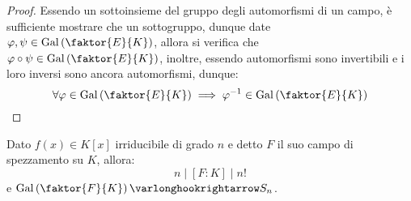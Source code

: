\documentclass[11pt]{scrartcl}
\begin{document}
\begin{proof}
    Essendo un sottoinsieme del gruppo degli automorfismi di un campo, è sufficiente mostrare che un sottogruppo, dunque date $\varphi,\psi \in \Gal\left(\faktor{E}{K}\right)$, allora 
    si verifica che $\varphi \circ \psi \in \Gal\left(\faktor{E}{K}\right)$, inoltre, essendo automorfismi sono invertibili e i loro inversi sono ancora automorfismi, dunque:
    \[ \forall \varphi \in \Gal\left(\faktor{E}{K}\right) \implies \varphi^{-1} \in \Gal\left(\faktor{E}{K}\right)
        \]
\end{proof}
   
\begin{proposition}
    \label{3.55}
    Dato $f(x) \in K[x]$ irriducibile di grado $n$ e detto $F$ il suo campo di spezzamento su $K$, allora:
    \[ n \mid [F : K] \mid n!
        \]
    e $\Gal\left(\faktor{F}{K}\right) \varlonghookrightarrow S_n$. 
\end{proposition}
\end{document}
